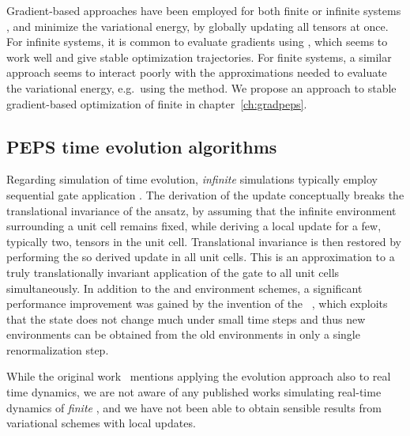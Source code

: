 Gradient-based approaches have been employed for both finite \cite{liu2017, liu2021, vieijra2021, orourke2023, scheb2023} or infinite systems \cite{vanderstraeten2016, hasik2021, liao2019, francuz2023}, and minimize the variational energy, by globally updating all tensors at once.
%
For infinite systems, it is common to evaluate gradients using , which seems to work well and give stable optimization trajectories.
%
For finite systems, a similar approach seems to interact poorly with the approximations needed to evaluate the variational energy, e.g.~using the  method.
%
We propose an approach to stable gradient-based optimization of finite  in chapter~\ref{ch:gradpeps}.


\subsection{PEPS time evolution algorithms}
\label{subsec:tensornets:peps:time_evolution}

Regarding simulation of time evolution, \emph{infinite}  simulations typically employ sequential gate application \cite{czarnik2019, dziarmaga2021}.
%
The derivation of the update conceptually breaks the translational invariance of the ansatz, by assuming that the infinite environment surrounding a unit cell remains fixed, while deriving a local update for a few, typically two, tensors in the unit cell.
%
Translational invariance is then restored by performing the so derived update in all unit cells.
%
This is an approximation to a truly translationally invariant application of the gate to all unit cells simultaneously.
%
In addition to the  and  environment schemes, a significant performance improvement was gained by the invention of the ~\cite{phien2015}, which exploits that the state does not change much under small time steps and thus new environments can be obtained from the old environments in only a single ~\cite{orus2009} renormalization step.

While the original  work~\cite{verstraete2004} mentions applying the evolution approach also to real time dynamics, we are not aware of any published works simulating real-time dynamics of \emph{finite} , and we have not been able to obtain sensible results from variational schemes with local updates.

